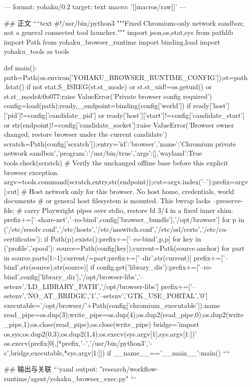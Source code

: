 ---
format: yohaku/0.2
target: text
macro: '[[macros/raw]]'
---

## 正文
````text
#!/usr/bin/python3
"""Fixed Chromium-only network sandbox; not a general connected tool launcher."""
import json,os,stat,sys
from pathlib import Path
from yohaku_browser_runtime import binding,load
import yohaku_tools as tools

def main():
 path=Path(os.environ['YOHAKU_BROWSER_RUNTIME_CONFIG']);st=path.lstat()
 if not stat.S_ISREG(st.st_mode) or st.st_uid!=os.getuid() or st.st_mode&0o077:raise ValueError('Private browser config required')
 config=load(path);ready,_,endpoint=binding(config['world'])
 if ready['host']['pid']!=config['candidate_pid'] or ready['host']['start']!=config['candidate_start'] or str(endpoint)!=config['candidate_socket']:raise ValueError('Browser owner changed; restore browser under the current candidate')
 scratch=Path(config['scratch']);entry={'id':'browser','name':'Chromium private network sandbox','program':'/usr/bin/true','args':[],'wayland':True}
 tools.check(scratch) # Verify the unchanged offline base before this explicit browser exception.
 argv=tools.command(scratch,entry,str(endpoint));cut=argv.index('--');prefix=argv[:cut]
 # Host network only for this browser. No host home, credentials, world documents
 # or general host filesystem is mounted. This bwrap lacks --preserve-fds;
 # carry Playwright pipes over stdio, restore fd 3/4 in a fixed inner shim.
 prefix+=['--share-net','--ro-bind',config['browser_bundle'],'/opt/browser']
 for p in ('/etc/resolv.conf','/etc/hosts','/etc/nsswitch.conf','/etc/ssl/certs','/etc/ca-certificates'):
  if Path(p).exists():prefix+=['--ro-bind',p,p]
 for key in ('profile','spool'):
  source=Path(config[key]);current=Path(source.anchor)
  for part in source.parts[1:-1]:current/=part;prefix+=['--dir',str(current)]
  prefix+=['--bind',str(source),str(source)]
 if config.get('library_dir'):prefix+=['--ro-bind',config['library_dir'],'/opt/browser-libs','--setenv','LD_LIBRARY_PATH','/opt/browser-libs']
 prefix+=['--setenv','NO_AT_BRIDGE','1','--setenv','GTK_USE_PORTAL','0']
 executable='/opt/browser/'+Path(config['chromium_executable']).name
 read_pipe=os.dup(3);write_pipe=os.dup(4);os.dup2(read_pipe,0);os.dup2(write_pipe,1);os.close(read_pipe);os.close(write_pipe)
 bridge='import os,sys;os.dup2(0,3);os.dup2(1,4);os.execv(sys.argv[1],sys.argv[1:])'
 os.execv(prefix[0],[*prefix,'--','/usr/bin/python3','-c',bridge,executable,*sys.argv[1:]])
if __name__=='__main__':main()
````

## 输出与关联
```yaml
output: "research/workflow-runtime/agent/yohaku_browser_exec.py"
```
